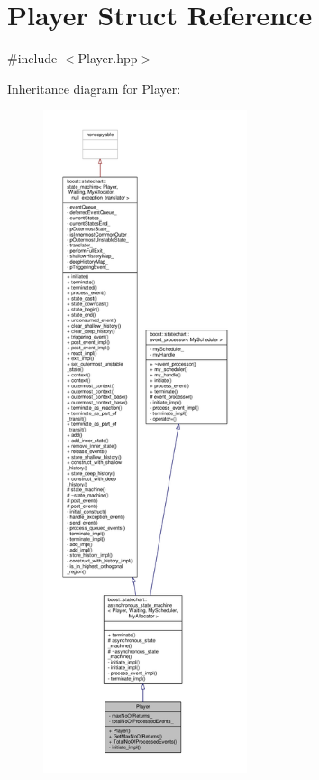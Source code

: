 \hypertarget{struct_player}{}\section{Player Struct Reference}
\label{struct_player}


{\ttfamily \#include $<$Player.\+hpp$>$}



Inheritance diagram for Player\+:
\nopagebreak
\begin{figure}[H]
\begin{center}
\leavevmode
\includegraphics[height=550pt]{struct_player__inherit__graph}
\end{center}
\end{figure}


